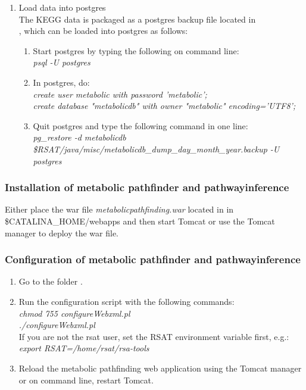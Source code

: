 \documentclass{book}
\begin{document}
\begin{enumerate}
\begin{enumerate}
\item Load data into postgres\\
The KEGG data is packaged as a postgres backup file located in\\
,
which can be loaded into postgres as follows:
\begin{enumerate}
\item Start postgres by typing the following on command line:\\
\textit{psql -U postgres}
\item In postgres, do:\\
\textit{create user metabolic with password 'metabolic';}\\
\textit{create database "metabolicdb" with owner "metabolic" encoding='UTF8';}
\item Quit postgres and type the following command in one line:\\
\textit{pg\_restore -d metabolicdb \$RSAT/java/misc/metabolicdb\_dump\_day\_month\_year.backup -U postgres}
\end{enumerate}

\end{enumerate}

\end{enumerate}

\subsubsection{Installation of metabolic pathfinder and pathwayinference}
Either place the war file \textit{metabolicpathfinding.war} located
in  in\\
\$CATALINA\_HOME/webapps and then start
Tomcat or use the Tomcat manager to deploy the war file.

\subsubsection{Configuration of metabolic pathfinder and pathwayinference}

\begin{enumerate}
\item Go to the folder .

\item Run the configuration script with the following commands:\\
      \textit{chmod 755 configureWebxml.pl}\\
      \textit{./configureWebxml.pl}\\
       If you are not the rsat user, set the RSAT environment variable first, e.g.:\\
      \textit{export RSAT=/home/rsat/rsa-tools}

\item Reload the metabolic pathfinding web application using the Tomcat manager or
      on command line, restart Tomcat.
\end{enumerate}
\end{document}
